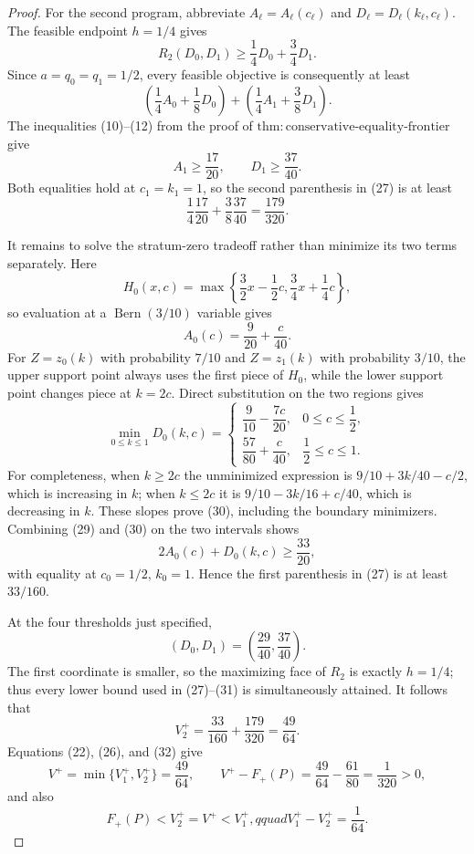 \documentclass{article}
\begin{document}
\begin{proof}
For the second program, abbreviate
\(A_\ell=A_\ell(c_\ell)\) and
\(D_\ell=D_\ell(k_\ell,c_\ell)\).  The feasible endpoint
\(h=1/4\) gives
\[
 R_2(D_0,D_1)\geq\frac14D_0+\frac34D_1.
\]
Since \(a=q_0=q_1=1/2\), every feasible objective is consequently at
least
\[
 \left(\frac14A_0+\frac18D_0\right)
 +\left(\frac14A_1+\frac38D_1\right).                          \tag{27}
\]
The inequalities (10)--(12) from the proof of
\(\mathrm{thm{:}conservative\text{-}equality\text{-}frontier}\) give
\[
 A_1\geq\frac{17}{20},\qquad D_1\geq\frac{37}{40}.
\]
Both equalities hold at \(c_1=k_1=1\), so the second parenthesis in
(27) is at least
\[
 \frac14\frac{17}{20}+\frac38\frac{37}{40}
 =\frac{179}{320}.                                             \tag{28}
\]

It remains to solve the stratum-zero tradeoff rather than minimize its
two terms separately.  Here
\[
 H_0(x,c)=\max\left\{\frac32x-\frac12c,
                         \frac34x+\frac14c\right\},
\]
so evaluation at a \(\operatorname{Bern}(3/10)\) variable gives
\[
 A_0(c)=\frac9{20}+\frac{c}{40}.                               \tag{29}
\]
For \(Z=z_0(k)\) with probability \(7/10\) and \(Z=z_1(k)\) with
probability \(3/10\), the upper support point always uses the first
piece of \(H_0\), while the lower support point changes piece at
\(k=2c\).  Direct substitution on the two regions gives
\[
 \min_{0\leq k\leq1}D_0(k,c)=
 \begin{cases}
 \dfrac9{10}-\dfrac{7c}{20},&0\leq c\leq\dfrac12,\\[2mm]
 \dfrac{57}{80}+\dfrac{c}{40},&\dfrac12\leq c\leq1.
 \end{cases}                                                   \tag{30}
\]
For completeness, when \(k\geq2c\) the unminimized expression is
\(9/10+3k/40-c/2\), which is increasing in \(k\); when
\(k\leq2c\) it is \(9/10-3k/16+c/40\), which is decreasing in
\(k\).  These slopes prove (30), including the boundary minimizers.
Combining (29) and (30) on the two intervals shows
\[
 2A_0(c)+D_0(k,c)\geq\frac{33}{20},                            \tag{31}
\]
with equality at \(c_0=1/2\), \(k_0=1\).  Hence the first
parenthesis in (27) is at least \(33/160\).

At the four thresholds just specified,
\[
 (D_0,D_1)=\left(\frac{29}{40},\frac{37}{40}\right).
\]
The first coordinate is smaller, so the maximizing face of \(R_2\)
is exactly \(h=1/4\); thus every lower bound used in (27)--(31) is
simultaneously attained.  It follows that
\[
 V_2^+=\frac{33}{160}+\frac{179}{320}=\frac{49}{64}.            \tag{32}
\]
Equations (22), (26), and (32) give
\[
 V^+=\min\{V_1^+,V_2^+\}=\frac{49}{64},\qquad
 V^+-F_+(P)=\frac{49}{64}-\frac{61}{80}=\frac1{320}>0,         \tag{33}
\]
and also
\[
 F_+(P)<V_2^+=V^+<V_1^+,qquad V_1^+-V_2^+=\frac1{64}.          \tag{34}
\]


\end{proof}
\end{document}
